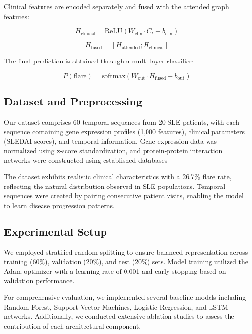 \documentclass[conference]{IEEEtran}
\begin{document}
Clinical features are encoded separately and fused with the attended graph features:

\begin{equation}
H_{\text{clinical}} = \text{ReLU}(W_{\text{clin}} \cdot C_t + b_{\text{clin}})
\end{equation}

\begin{equation}
H_{\text{fused}} = [H_{\text{attended}}; H_{\text{clinical}}]
\end{equation}

The final prediction is obtained through a multi-layer classifier:

\begin{equation}
P(\text{flare}) = \text{softmax}(W_{\text{out}} \cdot H_{\text{fused}} + b_{\text{out}})
\end{equation}

\subsection{Dataset and Preprocessing}

Our dataset comprises 60 temporal sequences from 20 SLE patients, with each sequence containing gene expression profiles (1,000 features), clinical parameters (SLEDAI scores), and temporal information. Gene expression data was normalized using z-score standardization, and protein-protein interaction networks were constructed using established databases.

The dataset exhibits realistic clinical characteristics with a 26.7\% flare rate, reflecting the natural distribution observed in SLE populations. Temporal sequences were created by pairing consecutive patient visits, enabling the model to learn disease progression patterns.

\subsection{Experimental Setup}

We employed stratified random splitting to ensure balanced representation across training (60\%), validation (20\%), and test (20\%) sets. Model training utilized the Adam optimizer with a learning rate of 0.001 and early stopping based on validation performance.

For comprehensive evaluation, we implemented several baseline models including Random Forest, Support Vector Machines, Logistic Regression, and LSTM networks. Additionally, we conducted extensive ablation studies to assess the contribution of each architectural component.
\end{document}
